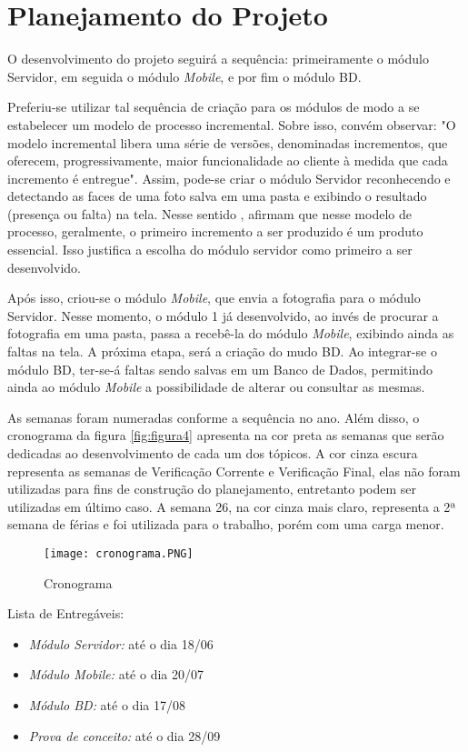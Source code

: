 \chapter{Planejamento do Projeto}
\noindent
O desenvolvimento do projeto seguirá a sequência: primeiramente o módulo Servidor, em seguida o módulo \textit{Mobile}, e por fim o módulo BD. 

Preferiu-se utilizar tal sequência de criação para os módulos de modo a se estabelecer um modelo de processo incremental. Sobre isso, convém observar: "O modelo incremental libera uma série de versões, denominadas incrementos, que oferecem, progressivamente, maior funcionalidade ao cliente à medida que cada incremento é entregue"\cite[p. 44]{engenhariasoftware}. Assim, pode-se criar o módulo Servidor reconhecendo e detectando as faces de uma foto salva em uma pasta e exibindo o resultado (presença ou falta) na tela. Nesse sentido \citep{engenhariasoftware}, afirmam que nesse modelo de processo, geralmente, o primeiro incremento a ser produzido é um produto essencial. Isso justifica a escolha do módulo servidor como primeiro a ser desenvolvido.

Após isso, criou-se o módulo \textit{Mobile}, que envia a fotografia para o módulo Servidor. Nesse momento, o módulo 1 já desenvolvido, ao invés de procurar a fotografia em uma pasta, passa a recebê-la do módulo \textit{Mobile}, exibindo ainda as faltas na tela. A próxima etapa, será a criação do mudo BD. Ao integrar-se o módulo BD, ter-se-á faltas sendo salvas em um Banco de Dados, permitindo ainda ao módulo \textit{Mobile} a possibilidade de alterar ou consultar as mesmas. 

As semanas foram numeradas conforme a sequência no ano. Além disso, o cronograma da figura \ref{fig:figura4} apresenta na cor preta as semanas que serão dedicadas ao desenvolvimento de cada um dos tópicos. A cor cinza escura representa as semanas de Verificação Corrente e Verificação Final, elas não foram utilizadas para fins de construção do planejamento, entretanto podem ser utilizadas em último caso. A semana 26, na cor cinza mais claro, representa a 2ª semana de férias e foi utilizada para  o trabalho, porém com uma carga menor. 

\begin{figure}[!ht]
	\centering
	\texttt{[image: cronograma.PNG]}   
	\caption{Cronograma}
	\label{fig:figura5}
\end{figure}

Lista de Entregáveis:
\begin{itemize}
\item \textit{Módulo Servidor:} até o dia 18/06
\item \textit{Módulo Mobile:} até o dia 20/07
\item \textit{Módulo BD:} até o dia 17/08
\item \textit{Prova de conceito:} até o dia 28/09
\end{itemize}


